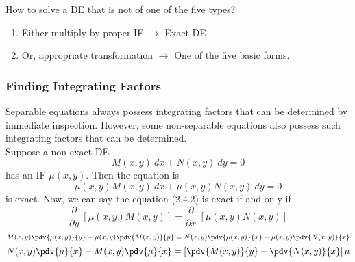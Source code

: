 How to solve a DE that is not of one of the five types?
\begin{enumerate}
    \item Either multiply by proper IF $ \to $ Exact DE
    \item Or, appropriate transformation $ \to $ One of the five basic forms.
\end{enumerate}


\subsubsection{Finding Integrating Factors}

Separable equations always possess integrating factors that can be determined by immediate inspection. However, some non-separable equations also possess such integrating factors that can be determined.\\

Suppose a non-exact DE
\begin{equation}
    M(x,y) \: d{x} + N(x,y) \: d{y} = 0
\end{equation}
has an IF $\mu(x,y)$. Then the equation is
\begin{equation}
    \mu(x,y)M(x,y) \: d{x} + \mu(x,y)N(x,y) \: d{y} = 0
\end{equation}
is exact. Now, we can say the equation (2.4.2) is exact if and only if \[
    \frac{\partial}{\partial{y}} \: \left[ \mu(x,y)M(x,y) \right] = \frac{\partial}{\partial{x}} \: \left[ \mu(x,y)N(x,y) \right]
\]\[
    M(x,y)\pdv{\mu(x,y)}{y} + \mu(x,y)\pdv{M(x,y)}{y} = N(x,y)\pdv{\mu(x,y)}{x} + \mu(x,y)\pdv{N(x,y)}{x} 
\]
\begin{equation}
    N(x,y)\pdv{\mu}{x} - M(x,y)\pdv{\mu}{x} = \left[ \pdv{M(x,y)}{y} - \pdv{N(x,y)}{x} \right] \mu
\end{equation}








